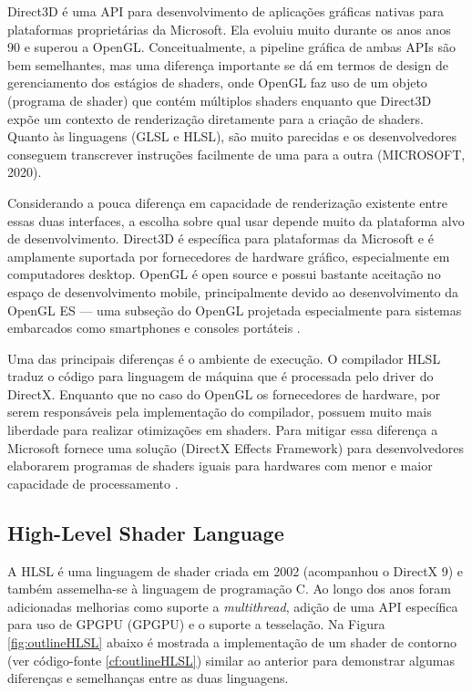 Direct3D é uma API para desenvolvimento de aplicações gráficas nativas para plataformas proprietárias da Microsoft. Ela evoluiu muito durante os anos anos 90 e superou a OpenGL. Conceitualmente, a pipeline gráfica de ambas APIs são bem semelhantes, mas uma diferença importante se dá em termos de design de gerenciamento dos estágios de shaders, onde OpenGL faz uso de um objeto (programa de shader) que contém múltiplos shaders enquanto que Direct3D expõe um contexto de renderização diretamente para a criação de shaders. Quanto às linguagens (GLSL e HLSL), são muito parecidas e os desenvolvedores conseguem transcrever instruções facilmente de uma para a outra (MICROSOFT, 2020)\nocite{Direct3D}.

Considerando a pouca diferença em capacidade de renderização existente entre essas duas interfaces, a escolha sobre qual usar depende muito da plataforma alvo de desenvolvimento. Direct3D é específica para plataformas da Microsoft e é amplamente suportada por fornecedores de hardware gráfico, especialmente em computadores desktop. OpenGL é open source e possui bastante aceitação no espaço de desenvolvimento mobile, principalmente devido ao desenvolvimento da OpenGL ES --- uma subseção do OpenGL projetada especialmente para sistemas embarcados como smartphones e consoles portáteis \cite{HLSLBook}.

Uma das principais diferenças é o ambiente de execução. O compilador HLSL traduz o código para linguagem de máquina que é processada pelo driver do DirectX. Enquanto que no caso do OpenGL os fornecedores de hardware, por serem responsáveis pela implementação do compilador, possuem muito mais liberdade para realizar otimizações em shaders. Para mitigar essa diferença a Microsoft fornece uma solução (DirectX Effects Framework) para desenvolvedores elaborarem programas de shaders iguais para hardwares com menor e maior capacidade de processamento \cite{GLSLBook}.

\subsection{High-Level Shader Language}
\label{sec:hlsl}

A HLSL é uma linguagem de shader criada em 2002 (acompanhou o DirectX 9) e também assemelha-se à linguagem de programação C. Ao longo dos anos foram adicionadas melhorias como suporte a \textit{\Gls{multithread}}, adição de uma API específica para uso de GPGPU (\acrlong{GPGPU}) e o suporte a tesselação. Na Figura \ref{fig:outlineHLSL} abaixo é mostrada a implementação de um shader de contorno (ver código-fonte \ref{cf:outlineHLSL}) similar ao anterior para demonstrar algumas diferenças e semelhanças entre as duas linguagens.

